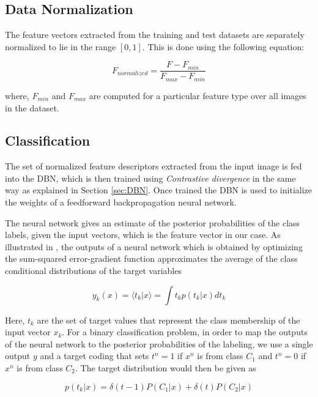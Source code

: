 \documentclass[11pt,a4paper]{article}
\begin{document}
\subsection{Data Normalization}
The feature vectors extracted from the training and test datasets are separately normalized to lie in the range $[0,1]$. This is done using the following equation:

\begin{equation}
F_{normalized} = \frac{F-F_{min}}{F_{max}-F_{min}}
\end{equation}

where, $F_{min}$ and $F_{max}$ are computed for a particular feature type over all images in the dataset.

\subsection{Classification}
The set of normalized feature descriptors extracted from the input image is fed into the DBN, which is then trained using \emph{Contrastive divergence} in the same way as explained in Section \ref{sec:DBN}. Once trained the DBN is used to initialize the weights of a feedforward backpropagation neural network. 

The neural network gives an estimate of the posterior probabilities of the class labels, given the input vectors, which is the feature vector in our case. As illustrated in \cite{Bishop1995}, the outputs of a neural network which is obtained by optimizing the sum-squared error-gradient function approximates the average of the class conditional distributions of the target variables

\begin{equation} \label{eq:1}
y_k(x) = \langle t_k|x \rangle = \int t_k p(t_k|x)dt_k
\end{equation}

Here, $t_k$ are the set of target values that represent the class membership of the input vector $x_k$. For a binary classification problem, in order to map the outputs of the neural network to the posterior probabilities of the labeling, we use a single output $y$ and a target coding that sets $t^n=1$ if $x^n$ is from class $C_1$ and $t^n=0$ if $x^n$ is from class $C_2$. The target distribution would then be given as

\begin{equation} \label{eq:2}
p(t_k|x) = \delta{(t-1)}P(C_1|x) + \delta{(t)}P(C_2|x)
\end{equation}
\end{document}
